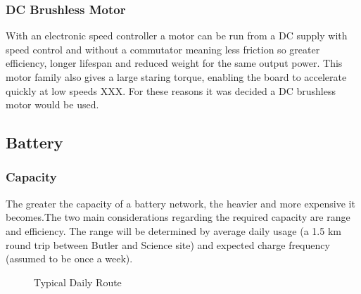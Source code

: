 \documentclass[journal,10pt]{IEEEtran}
\begin{document}
        \subsubsection{DC Brushless Motor}
            With an electronic speed controller a motor can be run from a DC supply with speed control and without a commutator meaning less friction so greater efficiency, longer lifespan and reduced weight for the same output power. This motor family also gives a large staring torque, enabling the board to accelerate quickly at low speeds XXX. For these reasons it was decided a DC brushless motor would be used.
    \subsection{Battery}
        \subsubsection{Capacity}
            The greater the capacity of a battery network, the heavier and more expensive it becomes.The two main considerations regarding the required capacity are range and efficiency. The range will be determined by average daily usage (a 1.5 km round trip between Butler and Science site) and expected charge frequency (assumed to be once a week).
            \begin{figure}[H]
                \centering
                \caption{Typical Daily Route}
                \label{fig:route}
            \end{figure}
\end{document}
